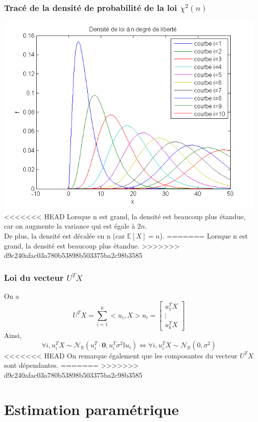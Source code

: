 \documentclass{report}
\begin{document}
		\subsection{Tracé de la densité de probabilité de la loi $\chi^2(n)$}
			\includegraphics[scale=0.7]{sources/Q252.png} \\
<<<<<<< HEAD
			Lorsque n est grand, la densité est beaucoup plus étandue, car on augmente la variance qui est égale à $2n$.\\
			De plus, la densité est décalée en n (car $\mathbb{E}[X] = n$).
=======
			Lorsque n est grand, la densité est beaucoup plus étandue.
>>>>>>> d9c240afac03a780b53898b503375ba2c98b3585
		\subsection{Loi du vecteur $U^TX$}
			On a
			\[ U^TX = \sum\limits_{i=1}^k <u_i, X>u_i = 
			\left[
				\begin{array}{c}
					u_1^TX \\
					\vdots \\
					u_k^TX
				\end{array}
			\right] \]
			Ainsi,
			\[ \forall i, u_i^TX \sim \mathcal{N}_\mathbb{R}(u_i^T \cdot \textbf{0}, u_i^T \sigma^2 \mathbb{I} u_i) \Leftrightarrow \forall i, u_i^TX \sim \mathcal{N}_\mathbb{R}(0, \sigma^2) \]
<<<<<<< HEAD
			On remarque également que les composantes du vecteur $U^TX$ sont dépendantes.
=======
>>>>>>> d9c240afac03a780b53898b503375ba2c98b3585

\chapter{Estimation paramétrique}
\end{document}

